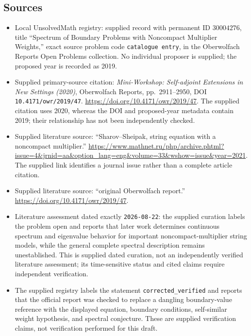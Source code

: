 \documentclass[11pt]{article}
\begin{document}
\subsection{Sources}
\begin{itemize}
\item Local UnsolvedMath registry: supplied record with permanent ID \(30004276\), title ``Spectrum of Boundary Problems with Noncompact Multiplier Weights,'' exact source problem code \texttt{catalogue entry}, in the Oberwolfach Reports Open Problems collection. No individual proposer is supplied; the proposed year is recorded as 2019.
\item Supplied primary-source citation: \emph{Mini-Workshop: Self-adjoint Extensions in New Settings (2020)}, Oberwolfach Reports, pp.\ 2911--2950, DOI \texttt{10.4171/owr/2019/47}. \url{https://doi.org/10.4171/owr/2019/47}. The supplied citation uses 2020, whereas the DOI and proposed-year metadata contain 2019; their relationship has not been independently checked.
\item Supplied literature source: ``Sharov--Sheipak, string equation with a noncompact multiplier.'' \url{https://www.mathnet.ru/php/archive.phtml?issue=4&jrnid=aa&option_lang=eng&volume=33&wshow=issue&year=2021}. The supplied link identifies a journal issue rather than a complete article citation.
\item Supplied literature source: ``original Oberwolfach report.'' \url{https://doi.org/10.4171/owr/2019/47}.
\item Literature assessment dated exactly \texttt{2026-08-22}: the supplied curation labels the problem open and reports that later work determines continuous spectrum and eigenvalue behavior for important noncompact-multiplier string models, while the general complete spectral description remains unestablished. This is supplied dated curation, not an independently verified literature assessment; its time-sensitive status and cited claims require independent verification.
\item The supplied registry labels the statement \texttt{corrected\_verified} and reports that the official report was checked to replace a dangling boundary-value reference with the displayed equation, boundary conditions, self-similar weight hypothesis, and spectral conjecture. These are supplied verification claims, not verification performed for this draft.
\end{itemize}
\end{document}
